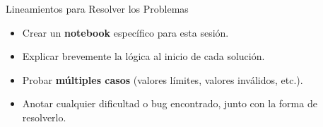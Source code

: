 \documentclass[10pt]{beamer}
\begin{document}
\begin{frame}{Lineamientos para Resolver los Problemas}
  \begin{itemize}
    \item Crear un \textbf{notebook} específico para esta sesión.
    \item Explicar brevemente la lógica al inicio de cada solución.
    \item Probar \textbf{múltiples casos} (valores límites, valores inválidos, etc.).
    \item Anotar cualquier dificultad o bug encontrado, junto con la forma de resolverlo.
  \end{itemize}
\end{frame}
\end{document}
